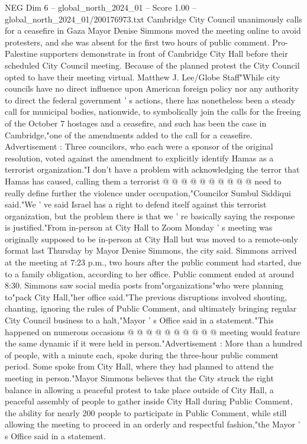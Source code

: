 \begin{textsample}{NEG Dim 6 – global\_north\_2024\_01 – Score 1.00 – global\_north\_2024\_01/200176973.txt}  \label{ex:f6_neg_330}
Cambridge City Council unanimously calls for a ceasefire in Gaza Mayor Denise Simmons moved the meeting online to avoid protesters, and she was absent for the first two hours of public comment.
Pro-Palestine supporters demonstrate in front of Cambridge City Hall before their scheduled City Council meeting.
Because of the planned protest the City Council opted to have their meeting virtual.
Matthew J.
Lee/Globe Staff"While city councils have no direct influence upon American foreign policy nor any authority to direct the federal government ' s actions, there has nonetheless been a steady call for municipal bodies, nationwide, to symbolically join the calls for the freeing of the October 7 hostages and a ceasefire, and such has been the case in Cambridge,"one of the amendments added to the call for a ceasefire.
Advertisement : Three councilors, who each were a sponsor of the original resolution, voted against the amendment to explicitly identify Hamas as a terrorist organization."I don't have a problem with acknowledging the terror that Hamas has caused, calling them a terrorist @ @ @ @ @ @ @ @ @ @ need to really define further the violence under occupation,"Councilor Sumbul Siddiqui said."We ' ve said Israel has a right to defend itself against this terrorist organization, but the problem there is that we ' re basically saying the response is justified."From in-person at City Hall to Zoom Monday ' s meeting was originally supposed to be in-person at City Hall but was moved to a remote-only format last Thursday by Mayor Denise Simmons, the city said.
Simmons arrived at the meeting at 7:23 p.m., two hours after the public comment had started, due to a family obligation, according to her office.
Public comment ended at around 8:30.
Simmons saw social media posts from"organizations"who were planning to"pack City Hall,"her office said."The previous disruptions involved shouting, chanting, ignoring the rules of Public Comment, and ultimately bringing regular City Council business to a halt,"Mayor ' s Office said in a statement."This happened on numerous occasions @ @ @ @ @ @ @ @ @ @ meeting would feature the same dynamic if it were held in person."Advertisement : More than a hundred of people, with a minute each, spoke during the three-hour public comment period.
Some spoke from City Hall, where they had planned to attend the meeting in person."Mayor Simmons believes that the City struck the right balance in allowing a peaceful protest to take place outside of City Hall, a peaceful assembly of people to gather inside City Hall during Public Comment, the ability for nearly 200 people to participate in Public Comment, while still allowing the meeting to proceed in an orderly and respectful fashion,"the Mayor ' s Office said in a statement.

\end{textsample}
